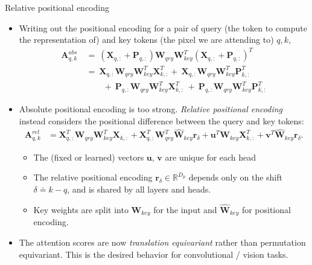 \documentclass[9pt]{beamer}
\newcommand{\bb}{\mathbb}
\newcommand{\mb}{\bm}
\begin{document}
\newcommand{\WW}{ \mb W_{qry}\mb W_{key}^T }
\begin{frame}{Relative positional encoding}
\begin{itemize}
\item Writing out the positional encoding for a pair of query (the token to compute the representation of) and key tokens (the pixel we are attending to) $q, k$,
\begin{align}
    \mb A^{abs}_{q, k} 
        \ &=\ (\mb X_{q,:} + \mb P_{q,:})\WW(\mb X_{q,:} + \mb P_{q,:})^T 
        \nonumber
        \\ &=\ \mb X_{q,:}\WW\mb X^T_{k,:} +\ \mb X_{q,:}\WW\mb P^T_{k,:} 
        \\ &\qquad +\ \mb P_{q,:}\WW\mb X^T_{k,:} \ +\ \mb P_{q,:}\WW\mb P^T_{k,:} \nonumber 
\end{align}

\item Absolute positional encoding is too strong. \emph{Relative positional encoding} instead considers the positional difference between the query and key tokens:
\vspace{-.05in}
\begin{align}
    \mb A^{rel}_{q, k} &= 
        \mb X_{q,:}^T \WW \mb X_{k,:}
        + \mb X_{q,:}^T \mb W_{qry}^T\hat{\mb W}_{key} \mb r_{\delta}
        + \mb u^T \mb W_{key} \mb X^T_{k,:}
        + \mb v^T \hat{\mb W}_{key} \mb r_{\delta}.
    \label{relposenc}
\end{align}
\vspace{-.18in}
\begin{itemize}
    \item The (fixed or learned) vectors $\bm u$, $\bm v$ are unique for each head 
    \item The relative positional encoding $\bm r_{\delta} \in \bb R^{D_p}$ depends only on the shift $\delta \doteq k -q$, and is shared by all layers and heads.
    \item Key weights are split into $\bm W_{key}$ for the input and $\hat{\bm W}_{key}$ for positional encoding.
\end{itemize}

\item The attention scores are now {\em translation equivariant} rather than permutation equivariant. This is the desired behavior for convolutional / vision tasks.
\end{itemize}
\end{frame}
\end{document}
